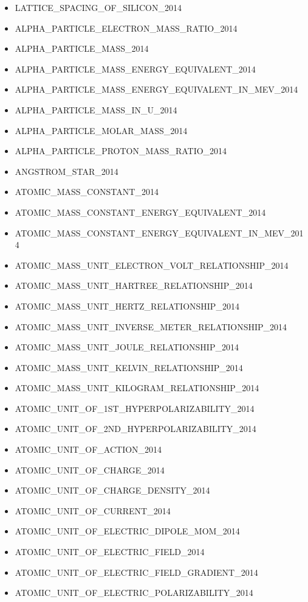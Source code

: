 \begin{itemize}
\item LATTICE\_SPACING\_OF\_SILICON\_2014
\item ALPHA\_PARTICLE\_ELECTRON\_MASS\_RATIO\_2014
\item ALPHA\_PARTICLE\_MASS\_2014
\item ALPHA\_PARTICLE\_MASS\_ENERGY\_EQUIVALENT\_2014
\item ALPHA\_PARTICLE\_MASS\_ENERGY\_EQUIVALENT\_IN\_MEV\_2014
\item ALPHA\_PARTICLE\_MASS\_IN\_U\_2014
\item ALPHA\_PARTICLE\_MOLAR\_MASS\_2014
\item ALPHA\_PARTICLE\_PROTON\_MASS\_RATIO\_2014
\item ANGSTROM\_STAR\_2014
\item ATOMIC\_MASS\_CONSTANT\_2014
\item ATOMIC\_MASS\_CONSTANT\_ENERGY\_EQUIVALENT\_2014
\item ATOMIC\_MASS\_CONSTANT\_ENERGY\_EQUIVALENT\_IN\_MEV\_2014
\item ATOMIC\_MASS\_UNIT\_ELECTRON\_VOLT\_RELATIONSHIP\_2014
\item ATOMIC\_MASS\_UNIT\_HARTREE\_RELATIONSHIP\_2014
\item ATOMIC\_MASS\_UNIT\_HERTZ\_RELATIONSHIP\_2014
\item ATOMIC\_MASS\_UNIT\_INVERSE\_METER\_RELATIONSHIP\_2014
\item ATOMIC\_MASS\_UNIT\_JOULE\_RELATIONSHIP\_2014
\item ATOMIC\_MASS\_UNIT\_KELVIN\_RELATIONSHIP\_2014
\item ATOMIC\_MASS\_UNIT\_KILOGRAM\_RELATIONSHIP\_2014
\item ATOMIC\_UNIT\_OF\_1ST\_HYPERPOLARIZABILITY\_2014
\item ATOMIC\_UNIT\_OF\_2ND\_HYPERPOLARIZABILITY\_2014
\item ATOMIC\_UNIT\_OF\_ACTION\_2014
\item ATOMIC\_UNIT\_OF\_CHARGE\_2014
\item ATOMIC\_UNIT\_OF\_CHARGE\_DENSITY\_2014
\item ATOMIC\_UNIT\_OF\_CURRENT\_2014
\item ATOMIC\_UNIT\_OF\_ELECTRIC\_DIPOLE\_MOM\_2014
\item ATOMIC\_UNIT\_OF\_ELECTRIC\_FIELD\_2014
\item ATOMIC\_UNIT\_OF\_ELECTRIC\_FIELD\_GRADIENT\_2014
\item ATOMIC\_UNIT\_OF\_ELECTRIC\_POLARIZABILITY\_2014

\end{itemize}

